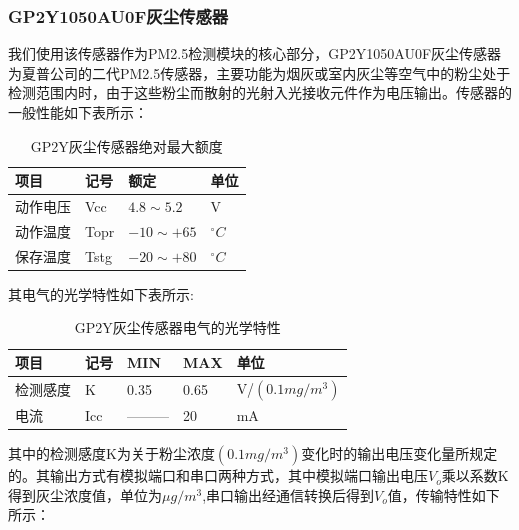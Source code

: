 \documentclass[a4paper, 11pt]{article} %
\begin{document}
\subsubsection{GP2Y1050AU0F灰尘传感器}
\par{} 我们使用该传感器作为PM2.5检测模块的核心部分，GP2Y1050AU0F灰尘传感器为夏普公司的二代PM2.5传感器，主要功能为烟灰或室内灰尘等空气中的粉尘处于检测范围内时，由于这些粉尘而散射的光射入光接收元件作为电压输出。传感器的一般性能如下表所示：
\begin{table}[H]
  \centering
  \label{tab1}
  \begin{threeparttable}
    \small
    \begin{tabular} {p{80pt}p{80pt}p{80pt}p{80pt}}
      \hline
      项目&记号&额定&单位\\
      \hline
      动作电压&Vcc&$4.8\sim 5.2$&V\\
      动作温度&Topr&$-10\sim +65$&$^{\circ}C$\\
      保存温度&Tstg&$-20 \sim +80$&$^{\circ}C$\\
      \hline
    \end{tabular}
    \small
  \end{threeparttable}
  \caption{GP2Y灰尘传感器绝对最大额度}
\end{table} 
\par{}其电气的光学特性如下表所示:

\begin{table}[H]
  \centering
  \caption{GP2Y灰尘传感器电气的光学特性}
  \label{tab2}
  \begin{threeparttable}
    \small
    \begin{tabular} {p{80pt}p{80pt}p{80pt}p{80pt}p{80pt}}
      \hline
      项目&记号&MIN&MAX&单位\\
      \hline
      检测感度&K&0.35&0.65&V/$(0.1mg/m^3)$\\
      电流&Icc&———&20&mA\\
      \hline
    \end{tabular}
    \small
  \end{threeparttable}
\end{table} 
\par{}其中的检测感度K为关于粉尘浓度$(0.1mg/m^3)$变化时的输出电压变化量所规定的。其输出方式有模拟端口和串口两种方式，其中模拟端口输出电压$V_o$乘以系数K得到灰尘浓度值，单位为$\mu g/m^3$,串口输出经通信转换后得到$V_o$值，传输特性如下所示：
\end{document}
